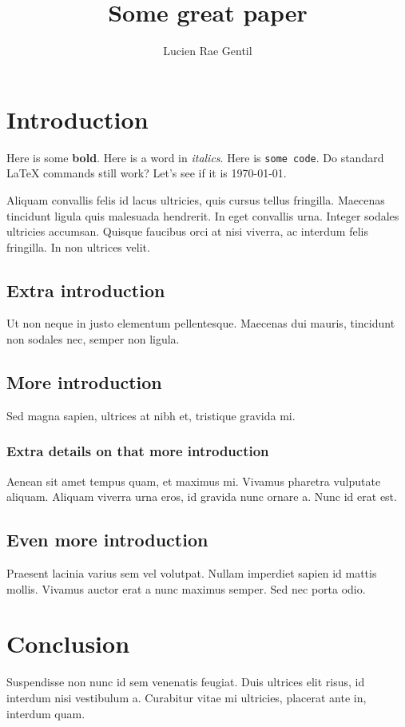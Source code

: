 \documentclass{article}
\title{Some great paper}
\author{Lucien Rae Gentil}
\date{}
\begin{document}

\maketitle

\section{Introduction}

Here is some \textbf{bold}. Here is a word in \textit{italics}. Here is \texttt{some code}. Do standard \LaTeX{} commands still work? Let's see if it is \today{}.

Aliquam convallis felis id lacus ultricies, quis cursus tellus fringilla. Maecenas tincidunt ligula quis malesuada hendrerit. In eget convallis urna. Integer sodales ultricies accumsan. Quisque faucibus orci at nisi viverra, ac interdum felis fringilla. In non ultrices velit. 

\subsection{Extra introduction}

Ut non neque in justo elementum pellentesque. Maecenas dui mauris, tincidunt non sodales nec, semper non ligula.

\subsection{More introduction}

Sed magna sapien, ultrices at nibh et, tristique gravida mi.

\subsubsection{Extra details on that more introduction}

Aenean sit amet tempus quam, et maximus mi. Vivamus pharetra vulputate aliquam. Aliquam viverra urna eros, id gravida nunc ornare a. Nunc id erat est.

\subsection{Even more introduction}

Praesent lacinia varius sem vel volutpat. Nullam imperdiet sapien id mattis mollis. Vivamus auctor erat a nunc maximus semper. Sed nec porta odio. 

\section{Conclusion}

Suspendisse non nunc id sem venenatis feugiat. Duis ultrices elit risus, id interdum nisi vestibulum a. Curabitur vitae mi ultricies, placerat ante in, interdum quam.

\end{document}
